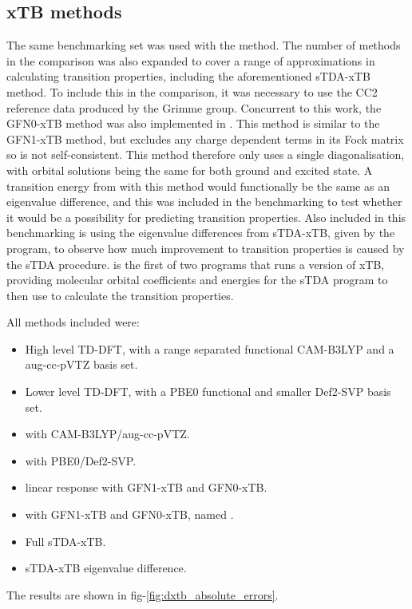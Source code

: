\subsection{xTB methods}
\label{subsec:dscf_gfn_tests}
The same benchmarking set was used with the \dxtb method. The number of methods
in the comparison was also expanded to cover a range of approximations in calculating
transition properties, including the aforementioned sTDA-xTB method. To include 
this in the comparison, it was necessary to use the CC2 reference data produced 
by the Grimme group.
Concurrent to this work, the GFN0-xTB method was also implemented in .
This method is similar to the GFN1-xTB method, but excludes any charge dependent
terms in its Fock matrix so is not self-consistent. This method therefore only
uses a single diagonalisation, with orbital solutions being the same for both
ground and excited state. A transition energy from \dscf with this method would
functionally be the same as an eigenvalue difference, and this was included in 
the benchmarking to test whether it would be a possibility for predicting transition
properties.
Also included in this benchmarking is using the eigenvalue differences from
sTDA-xTB, given by the  program, to observe how much improvement
to transition properties is caused by the sTDA procedure.  is the 
first of two programs that runs a version of xTB, providing molecular orbital
coefficients and energies for the sTDA program to then use to calculate the transition
properties.

All methods included were:
\begin{itemize}
    \item High level TD-DFT, with a range separated functional CAM-B3LYP and
     a aug-cc-pVTZ basis set.
    \item Lower level TD-DFT, with a PBE0 functional and smaller Def2-SVP basis set.
    \item \dscf with CAM-B3LYP/aug-cc-pVTZ.
    \item \dscf with PBE0/Def2-SVP.
    \item linear response with GFN1-xTB and GFN0-xTB.
    \item \dscf with GFN1-xTB and GFN0-xTB, named \dxtb.
    \item Full sTDA-xTB.
    \item sTDA-xTB eigenvalue difference.
\end{itemize}

The results are shown in fig-\ref{fig:dxtb_absolute_errors}.

